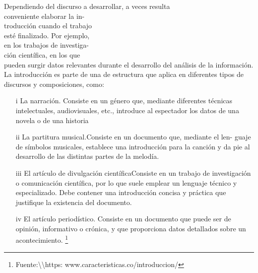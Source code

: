 \documentclass[12pt]{book}
\begin{document}
\begin{multicols}{2}
{\ttfamily
Dependiendo del discurso a desarrollar, 
{\color{green}a veces resulta} \\
{\color{green} conveniente elaborar la in- \\troducción 
cuando el trabajo \\
esté finalizado}. Por ejemplo, \\
en los trabajos de investiga-\\ción científica, en los que \\
pueden surgir datos relevantes 
durante el desarrollo del análisis
de la información.
\\

La introducción es parte de una de estructura que aplica
en diferentes tipos de discursos y 
composiciones, como:}

\end{multicols}
\begin{enumerate}
    \item[i] {\color{red}La narración}. Consiste en un género que, mediante diferentes técnicas
    intelectuales, audiovisuales, etc., introduce al espectador los datos de una
    {\sc novela} o de una {\sc historia}
    \item[ii] {\color{red}La partitura musical}.Consiste en un documento que, mediante el len-
    guaje de símbolos musicales, establece una introducción para la canción
    y da pie al desarrollo de las distintas partes de la melodía.
    \item[iii] {\color{red}El artículo de divulgación científica}Consiste en un trabajo de investigación o comunicación científica,
    por lo que suele emplear un lenguaje técnico y especializado. Debe contener una introducción concisa y
    práctica que justifique la existencia del documento. \newpage {}
    \item[iv] {\color{red}El artículo periodístico.} Consiste en un documento que puede ser de
    opinión, informativo o crónica, y que proporciona datos detallados sobre
    un acontecimiento. \renewcommand{\thefootnote}{\fnsymbol{footnote}}
    \footnote{Fuente:\textbackslash \textbackslash https: www.caracteristicas.co/introduccion/}
\end{enumerate}


\end{document}
